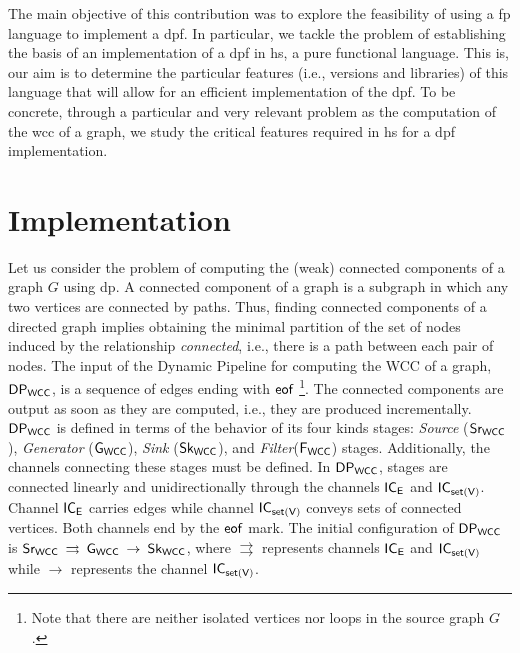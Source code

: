 The main objective of this contribution was to explore the feasibility of using a  \acrfull{fp} language to implement a \acrshort{dpf}. In particular, 
we tackle the problem of establishing the basis of an implementation of a \acrshort{dpf}  in \acrshort{hs}, a pure functional language. This is,  our aim is to determine the particular features (i.e., versions and libraries) 
of this language that will allow for an efficient implementation of the \acrshort{dpf}. To be concrete, through a particular and very relevant problem as the computation of the \acrfull{wcc} of a graph,  we study the critical features required in \acrshort{hs} for a \acrshort{dpf} implementation.

\section{Implementation}
Let us consider the problem of computing the (weak) connected components of a graph $G$ using \acrshort{dp}. A connected component of a graph is a subgraph in which any two vertices are connected by paths. Thus, finding connected components of a directed graph implies obtaining the minimal partition of the set of nodes induced by the relationship \textit{connected}, i.e., there is a path between each pair of nodes. The input of the Dynamic Pipeline for computing the WCC of a graph, $\mathsf{DP_{WCC}}$, is a sequence of edges ending with $\mathsf{eof}$%
\footnote{Note that there are neither isolated vertices nor loops in the source graph $G$.}. The connected components are output as soon as they are computed, i.e., they are produced incrementally. 
%
$\mathsf{DP_{WCC}}$ is defined in terms of the behavior of its four kinds stages: \textit{Source} ($\mathsf{Sr_{WCC}}$),  \textit{Generator} ($\mathsf{G_{WCC}}$),  \textit{Sink} ($\mathsf{Sk_{WCC}}$), and \textit{Filter}($\mathsf{F_{WCC}}$) stages. Additionally,  the channels connecting these stages must be defined. In $\mathsf{DP_{WCC}}$, stages are connected linearly and unidirectionally through the channels $\mathsf{IC_E}$ and  $\mathsf{IC_{set(V)}}$. Channel $\mathsf{IC_E}$ carries edges while channel  $\mathsf{IC_{set(V)}}$ conveys sets of connected vertices. Both channels end by the $\mathsf{eof}$ mark. The initial configuration of $\mathsf{DP_{WCC}}$ is $\mathsf{Sr_{WCC}} \:\rightrightarrows\:\mathsf{G_{WCC}} \:\rightarrow \: \mathsf{Sk_{WCC}}$, where $\rightrightarrows$ represents  channels $\mathsf{IC_E}$ and $\mathsf{IC_{set(V)}}$ while $\rightarrow$ represents the channel $\mathsf{IC_{set(V)}}$.
 
